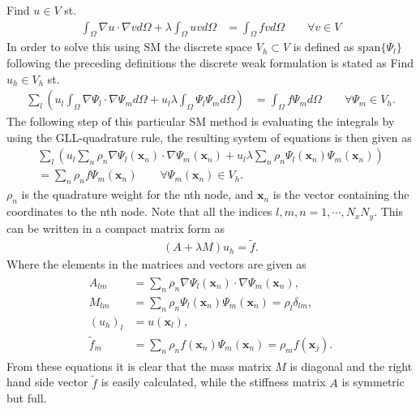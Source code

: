 Find $u\in V$ st. 
%
\begin{align}
    \int_{\Omega}\nabla u \cdot \nabla v d \Omega + \lambda \int_{\Omega} u vd \Omega 
    &= \int_{\Omega}f vd \Omega \qquad \forall v \in V
    \label{eq:Helmholtzweak}
\end{align}
%
In order to solve this using SM the discrete space $V_h \subset V$ is defined as $\text{span}\{\Psi_l\}$ following the preceding definitions 
the discrete weak formulation is stated as 
Find $u_h\in V_h$ st. 
%
\begin{align}
    \sum_l\left(  u_l\int_{\Omega}\nabla \Psi_l \cdot \nabla \Psi_m d \Omega + u_l\lambda \int_{\Omega} \Psi_l \Psi_md \Omega \right)
    &= \int_{\Omega}f \Psi_md \Omega \qquad \forall \Psi_m \in V_h.
    \label{eq:Helmholtzdiscrete}
\end{align}
%
The following step of this particular SM method is evaluating the integrals by using the GLL-quadrature rule, the resulting system of equations 
is then given as 
%
\begin{align}
    \sum_l\left(  u_l\sum_n \rho_n\nabla \Psi_l(\mathbf{x}_{n}) \cdot \nabla \Psi_m(\mathbf{x}_{n}) + u_l\lambda \sum_n \rho_n \Psi_l(\mathbf{x}_{n}) \Psi_m(\mathbf{x}_{n})\right)\\
     = \sum_n \rho_nf \Psi_m(\mathbf{x}_{n})\qquad \forall \Psi_m(\mathbf{x}_{n}) \in V_h.
    \label{eq:Helmholtzquad}
\end{align}
%
$\rho_n$ is the quadrature weight for the nth node, and $\mathbf{x}_n$ is the vector containing the coordinates to the nth node.
Note that all the indices $l,m,n=1,\cdots,N_xN_y$.
This can be written in a compact matrix form as 
\begin{align}
    (A+\lambda M)u_h = \tilde f.
    \label{eq:Helmholtzmat}
\end{align}
Where the elements in the matrices and vectors are given as 
\begin{align}
    \begin{split}
        A_{lm} &= \sum_n \rho_n\nabla \Psi_l(\mathbf{x}_{n}) \cdot \nabla \Psi_m(\mathbf{x}_{n}),\\
        M_{lm} &= \sum_n \rho_n \Psi_l(\mathbf{x}_{n}) \Psi_m(\mathbf{x}_{n}) = \rho_l\delta_{lm},\\
        (u_h)_l & = u(\mathbf{x}_l), \\
        \tilde f_m &= \sum_n \rho_n f(\mathbf{x}_{n}) \Psi_m(\mathbf{x}_{n}) = \rho_m f(\mathbf{x}_{j}).
    \end{split}
    \label{eq:Helmholtzmatelem}
\end{align}
From these equations it is clear that the mass matrix $M$ is diagonal and the right hand side vector $\tilde f$ is easily calculated, 
while the stiffness matrix $A$ is symmetric but full.

